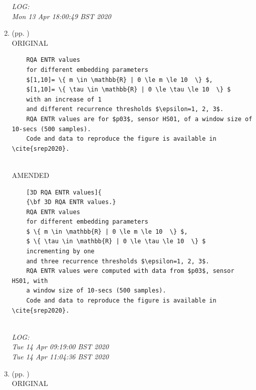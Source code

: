 \documentclass[10pt]{article}
\begin{document}
\begin{enumerate}
\begin{verbatim}
\end{verbatim}

\textit{
LOG: \\ 
Mon 13 Apr 18:00:49 BST 2020
}
\\





\item  (pp. ) \\
ORIGINAL
\begin{verbatim}
	RQA ENTR values 
	for different embedding parameters
	$[1,10]= \{ m \in \mathbb{R} | 0 \le m \le 10  \} $,
	$[1,10]= \{ \tau \in \mathbb{R} | 0 \le \tau \le 10  \} $
	with an increase of 1
	and different recurrence thresholds $\epsilon=1, 2, 3$.
	RQA ENTR values are for $p03$, sensor HS01, of a window size of 10-secs (500 samples).
	Code and data to reproduce the figure is available in \cite{srep2020}.
 
\end{verbatim}

AMENDED
\begin{verbatim}
	[3D RQA ENTR values]{
	{\bf 3D RQA ENTR values.}
	RQA ENTR values 
	for different embedding parameters
	$ \{ m \in \mathbb{R} | 0 \le m \le 10  \} $,
	$ \{ \tau \in \mathbb{R} | 0 \le \tau \le 10  \} $
	incrementing by one
	and three recurrence thresholds $\epsilon=1, 2, 3$.
	RQA ENTR values were computed with data from $p03$, sensor HS01, with 
	a window size of 10-secs (500 samples).
	Code and data to reproduce the figure is available in \cite{srep2020}.
        
\end{verbatim}

\textit{
LOG: \\ 
Tue 14 Apr 09:19:00 BST 2020 \\
Tue 14 Apr 11:04:36 BST 2020
}
\\




\item  (pp. ) \\
ORIGINAL
\begin{verbatim}


\end{verbatim}
\end{enumerate}
\end{document}
